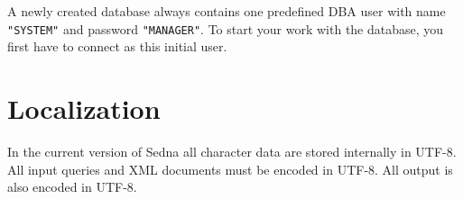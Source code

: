 \documentclass[a4paper,12pt]{article}
\begin{document}
A newly created database always contains one predefined DBA user with name \verb!"SYSTEM"! and password \verb!"MANAGER"!. To start your work with the database, you first have to connect as this initial user.

\section{Localization}
In the current version of Sedna all character data are stored internally in UTF-8.
All input queries and XML documents must be encoded in UTF-8.
All output is also encoded in UTF-8.
\end{document}

